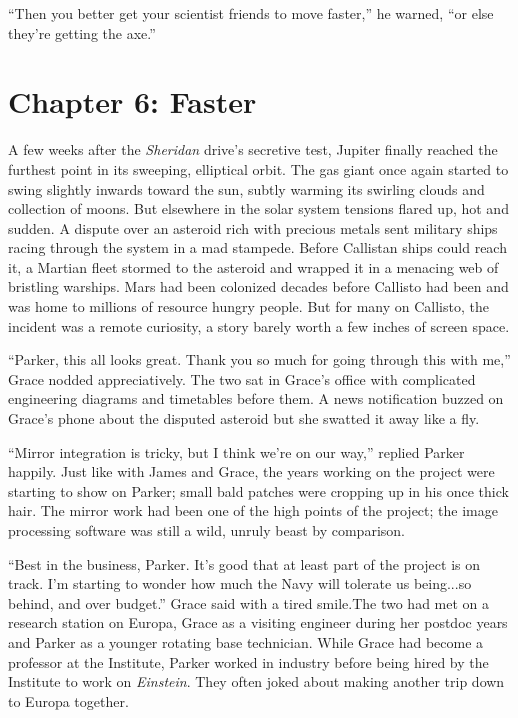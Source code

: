 \documentclass[12pt]{article} %
\begin{document}
``Then you better get your scientist friends to move faster,'' he warned, ``or else they're getting the axe.''

\newpage
\section{Chapter 6: Faster}

A few weeks after the \textit{Sheridan} drive's secretive test, Jupiter finally reached the furthest point in its sweeping, elliptical orbit. The gas giant once again started to swing slightly inwards toward the sun, subtly warming its swirling clouds and collection of moons. But elsewhere in the solar system tensions flared up, hot and sudden. A dispute over an asteroid rich with precious metals sent military ships racing through the system in a mad stampede. Before Callistan ships could reach it, a Martian fleet stormed to the asteroid and wrapped it in a menacing web of bristling warships. Mars had been colonized decades before Callisto had been and was home to millions of resource hungry people. But for many on Callisto, the incident was a remote curiosity, a story barely worth a few inches of screen space.

``Parker, this all looks great. Thank you so much for going through this with me,'' Grace nodded appreciatively. The two sat in Grace's office with complicated engineering diagrams and timetables before them. A news notification buzzed on Grace's phone about the disputed asteroid but she swatted it away like a fly. 

``Mirror integration is tricky, but I think we're on our way,'' replied Parker happily. Just like with James and Grace, the years working on the project were starting to show on Parker; small bald patches were cropping up in his once thick hair. The mirror work had been one of the high points of the project; the image processing software was still a wild, unruly beast by comparison.

``Best in the business, Parker. It's good that at least part of the project is on track. I'm starting to wonder how much the Navy will tolerate us being...so behind, and over budget.'' Grace said with a tired smile.The two had met on a research station on Europa, Grace as a visiting engineer during her postdoc years and Parker as a younger rotating base technician. While Grace had become a professor at the Institute, Parker worked in industry before being hired by the Institute to work on \textit{Einstein}. They often joked about making another trip down to Europa together. 
\end{document}
